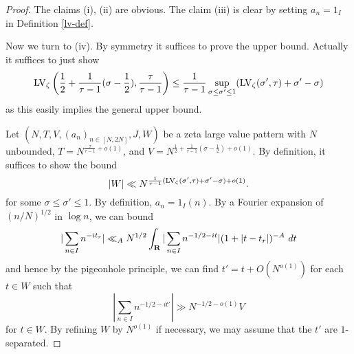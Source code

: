 \begin{proof}  The claims (i), (ii) are obvious.  The claim (iii) is clear by setting $a_n = 1_I$ in Definition \ref{lv-def}.

Now we turn to (iv).  By symmetry it suffices to prove the upper bound.  Actually it suffices to just show
$$ \mathrm{LV}_\zeta\left(\frac{1}{2} + \frac{1}{\tau-1} (\sigma-\frac{1}{2}), \frac{\tau}{\tau-1}\right) \leq \frac{1}{\tau-1} \sup_{\sigma \leq \sigma' \leq 1} (\mathrm{LV}_\zeta(\sigma',\tau) + \sigma'-\sigma)$$
as this easily implies the general upper bound.

Let $(N,T,V,(a_n)_{n \in [N,2N]},J,W)$ be a zeta large value pattern with
$N$ unbounded, $T= N^{\frac{\tau}{\tau-1}+o(1)}$, and $V = N^{\frac{1}{2} + \frac{1}{\tau-1} (\sigma-\frac{1}{2})+o(1)}$. By definition, it suffices to show the bound
\begin{equation}\label{r-targ}
    |W| \ll N^{\frac{1}{\tau-1} (\mathrm{LV}_\zeta(\sigma',\tau) + \sigma'-\sigma)+o(1)}.
\end{equation}
for some $\sigma \leq \sigma' \leq 1$.
By definition, $a_n = 1_I(n)$. By a Fourier expansion of $(n/N)^{1/2}$ in $\log n$, we can bound
$$ |\sum_{n \in I} n^{-it_r}| \ll_A N^{1/2} \int_\R |\sum_{n \in I} n^{-1/2-it}| (1 + |t-t_r|)^{-A}\ dt$$
and hence by the pigeonhole principle, we can find $t' = t + O(N^{o(1)})$ for each $t \in W$ such that
$$ |\sum_{n \in I} n^{-1/2-it'}| \gg N^{-1/2-o(1)} V$$
for $t \in W$.  By refining $W$ by $N^{o(1)}$ if necessary, we may assume that the $t'$ are $1$-separated.


\end{proof}
